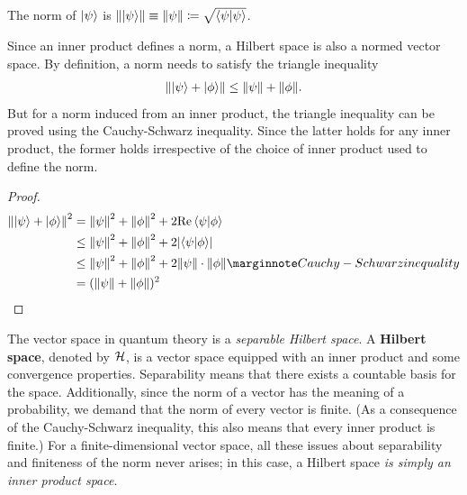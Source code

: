 \begin{definition}
	The norm of $\ket{\psi}$ is $\norm{\ket{\psi}} \equiv \norm{\psi} \coloneqq \sqrt{\braket{\psi}}$.
\end{definition}
\noindent Since an inner product defines a norm, a Hilbert space is also a normed vector space. By definition, a norm needs to satisfy the triangle inequality
\begin{align}
	\norm{\ket{\psi}+\ket{\phi}} \le \norm{\psi} + \norm{\phi}.
\end{align}
But for a norm induced from an inner product, the triangle inequality can be proved using the Cauchy-Schwarz inequality. Since the latter holds for any inner product, the former holds irrespective of the choice of inner product used to define the norm.
\begin{proof}
	\begin{align}
		\norm{\ket{\psi}+\ket{\phi}}^2 
		&= \norm{\psi}^2 + \norm{\phi}^2 + 2\mathrm{Re}\braket{\psi}{\phi} \\
		&\le \norm{\psi}^2 + \norm{\phi}^2 + 2\abs{\braket{\psi}{\phi}} \\
		&\le \norm{\psi}^2 + \norm{\phi}^2 + 2\norm{\psi}\cdot \norm{\phi}\mnf{Cauchy-Schwarz inequality} \\
		&= (\norm{\psi} + \norm{\phi})^2
	\end{align}
\end{proof}


The vector space in quantum theory is a \emph{separable Hilbert space}. A {\bf Hilbert space}, denoted by $\mathcal{H}$, is a vector space equipped with an inner product and some convergence properties. Separability means that there exists a countable basis for the space. Additionally, since the norm of a vector has the meaning of a probability, we demand that the norm of every vector is finite. (As a consequence of the Cauchy-Schwarz inequality, this also means that every inner product is finite.) For a finite-dimensional vector space, all these issues about separability and finiteness of the norm never arises; in this case, a Hilbert space \emph{is simply an inner product space}.


